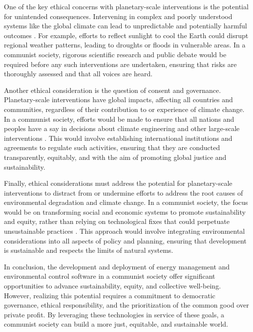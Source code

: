 One of the key ethical concerns with planetary-scale interventions is the potential for unintended consequences. Intervening in complex and poorly understood systems like the global climate can lead to unpredictable and potentially harmful outcomes \cite[pp.~410-420]{gardiner2011perfect}. For example, efforts to reflect sunlight to cool the Earth could disrupt regional weather patterns, leading to droughts or floods in vulnerable areas. In a communist society, rigorous scientific research and public debate would be required before any such interventions are undertaken, ensuring that risks are thoroughly assessed and that all voices are heard.

Another ethical consideration is the question of consent and governance. Planetary-scale interventions have global impacts, affecting all countries and communities, regardless of their contribution to or experience of climate change. In a communist society, efforts would be made to ensure that all nations and peoples have a say in decisions about climate engineering and other large-scale interventions \cite[pp.~55-63]{crutzen2006geoengineering}. This would involve establishing international institutions and agreements to regulate such activities, ensuring that they are conducted transparently, equitably, and with the aim of promoting global justice and sustainability.

Finally, ethical considerations must address the potential for planetary-scale interventions to distract from or undermine efforts to address the root causes of environmental degradation and climate change. In a communist society, the focus would be on transforming social and economic systems to promote sustainability and equity, rather than relying on technological fixes that could perpetuate unsustainable practices \cite[pp.~245-252]{shepherd2009geoengineering}. This approach would involve integrating environmental considerations into all aspects of policy and planning, ensuring that development is sustainable and respects the limits of natural systems.

In conclusion, the development and deployment of energy management and environmental control software in a communist society offer significant opportunities to advance sustainability, equity, and collective well-being. However, realizing this potential requires a commitment to democratic governance, ethical responsibility, and the prioritization of the common good over private profit. By leveraging these technologies in service of these goals, a communist society can build a more just, equitable, and sustainable world.